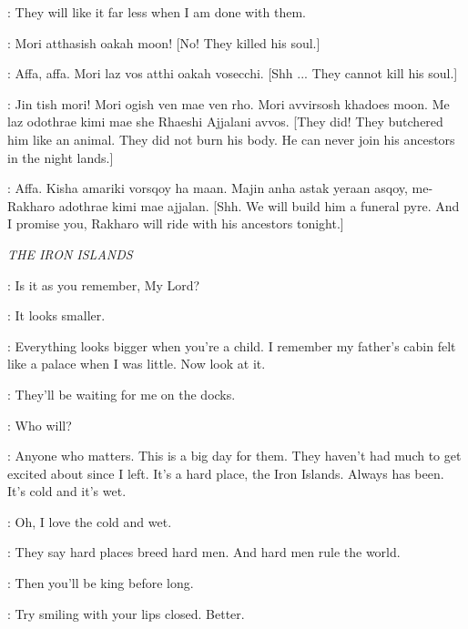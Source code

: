 \DAENERYS: They will like it far less when I am done with them.


\IRRI: Mori atthasish oakah moon! [No! They killed his soul.]

\DAENERYS: Affa, affa. Mori laz vos atthi oakah vosecchi. [Shh ... They cannot kill his soul.]

\IRRI: Jin tish mori! Mori ogish ven mae ven rho. Mori avvirsosh khadoes moon. Me laz odothrae kimi mae she Rhaeshi Ajjalani avvos. [They did! They butchered him like an animal. They did not burn his body. He can never join his ancestors in the night lands.]

\DAENERYS: Affa. Kisha amariki vorsqoy ha maan. Majin anha astak yeraan asqoy, me-Rakharo adothrae kimi mae ajjalan. [Shh. We will build him a funeral pyre. And I promise you, Rakharo will ride with his ancestors tonight.]


\scene

\textit{THE IRON ISLANDS}


\WOMAN: Is it as you remember, My Lord?

\THEON: It looks smaller.

\WOMAN: Everything looks bigger when you're a child. I remember my father's cabin felt like a palace when I was little. Now look at it.

\THEON: They'll be waiting for me on the docks.

\WOMAN: Who will?

\THEON: Anyone who matters. This is a big day for them. They haven't had much to get excited about since I left. It's a hard place, the Iron Islands. Always has been. It's cold and it's wet.

\WOMAN: Oh, I love the cold and wet.

\THEON: They say hard places breed hard men. And hard men rule the world.

\WOMAN:  Then you'll be king before long.

\THEON: Try smiling with your lips closed. Better.

